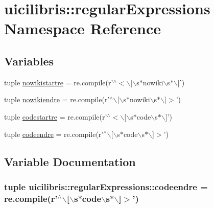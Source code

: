 \hypertarget{namespaceuicilibris_1_1regularExpressions}{\section{uicilibris\-:\-:regular\-Expressions \-Namespace \-Reference}
\label{namespaceuicilibris_1_1regularExpressions}
}
\subsection*{\-Variables}
\begin{DoxyCompactItemize}
\item 
tuple \hyperlink{namespaceuicilibris_1_1regularExpressions_afd5c26ee695e0e7bfc8dfc14ba7bb5fb}{nowikistartre} = re.\-compile(r'$^\wedge$$<$$\backslash$\mbox{[}$\backslash$s$\ast$nowiki$\backslash$s$\ast$$\backslash$\mbox{]}')
\item 
tuple \hyperlink{namespaceuicilibris_1_1regularExpressions_a7f24f7d69e7df8d8f11a48b51da3d05e}{nowikiendre} = re.\-compile(r'$^\wedge$$\backslash$\mbox{[}$\backslash$s$\ast$nowiki$\backslash$s$\ast$$\backslash$\mbox{]}$>$')
\item 
tuple \hyperlink{namespaceuicilibris_1_1regularExpressions_a18ed998acb9e817dddaa66dc71bb87b7}{codestartre} = re.\-compile(r'$^\wedge$$<$$\backslash$\mbox{[}$\backslash$s$\ast$code$\backslash$s$\ast$$\backslash$\mbox{]}')
\item 
tuple \hyperlink{namespaceuicilibris_1_1regularExpressions_a2f8a3fe37202f93c99c84b91a304f7dc}{codeendre} = re.\-compile(r'$^\wedge$$\backslash$\mbox{[}$\backslash$s$\ast$code$\backslash$s$\ast$$\backslash$\mbox{]}$>$')
\end{DoxyCompactItemize}


\subsection{\-Variable \-Documentation}
\hypertarget{namespaceuicilibris_1_1regularExpressions_a2f8a3fe37202f93c99c84b91a304f7dc}{
\subsubsection[{codeendre}]{\setlength{\rightskip}{0pt plus 5cm}tuple {\bf uicilibris\-::regular\-Expressions\-::codeendre} = re.\-compile(r'$^\wedge$$\backslash$\mbox{[}$\backslash$s$\ast$code$\backslash$s$\ast$$\backslash$\mbox{]}$>$')}}\label{namespaceuicilibris_1_1regularExpressions_a2f8a3fe37202f93c99c84b91a304f7dc}


